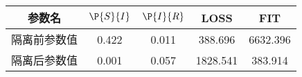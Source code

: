 \begin{tabular}{ccccc}
\hline
参数名&$\P{S}{I}$&$\P{I}{R}$&LOSS&FIT\\
\hline
隔离前参数值&0.422&0.011&388.696&6632.396\\
隔离后参数值&0.001&0.057&1828.541&383.914\\
\hline
\end{tabular}